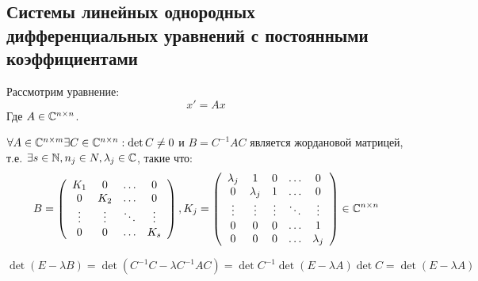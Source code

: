 

\subsection{Системы линейных однородных дифференциальных уравнений с постоянными коэффициентами}
Рассмотрим уравнение:
\begin{equation}
    x' = Ax
\end{equation}
Где \(A \in \mathbb{C}^{n \times n}\).

\begin{reminder}
    \(\forall A \in \mathbb{C}^{n \times m} \exists C \in \mathbb{C}^{n \times n}: \det C \ne 0\) и \(B = C^{-1}AC\) является жордановой матрицей, т.е. \(\exists s \in \mathbb{N}, n_j \in N, \lambda_j \in \mathbb{C}\), такие что:
    \[B = \left( \begin{array}{cccc}
        K_1 & 0 & \dots & 0 \\
        0 & K_2 & \dots & 0 \\
        \vdots & \vdots & \ddots & \vdots \\
        0 & 0 & \dots & K_s \\
    \end{array} \right), K_j =\left( \begin{array}{ccccc}
        \lambda_j & 1 & 0 & \dots & 0 \\
        0 & \lambda_j & 1 & \dots & 0 \\
        \vdots & \vdots & \vdots & \ddots & \vdots \\
        0 & 0 & 0 & \dots & 1 \\
        0 & 0 & 0 & \dots & \lambda_j \\
    \end{array} \right) \in \mathbb{C}^{n \times n}\]
\end{reminder}

\begin{note}
    \[\det(E - \lambda B) = \det(C^{-1}C - \lambda C^{-1}AC) = \det C^{-1} \det(E - \lambda A) \det C = \det(E - \lambda A)\]
\end{note}


